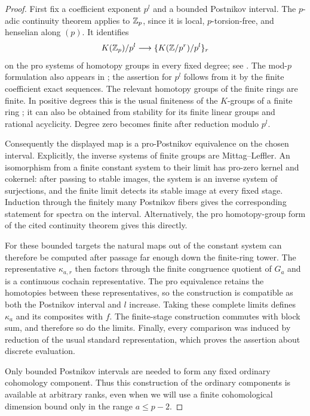\begin{proof}
First fix a coefficient exponent $p^l$ and a bounded Postnikov
interval.  The $p$-adic continuity theorem applies to $\mathbb Z_p$, since it
is local, $p$-torsion-free, and henselian along $(p)$.  It identifies
\[
 K(\mathbb Z_p)/p^l\longrightarrow
 \{K(\mathbb Z/p^r)/p^l\}_r
\]
on the pro systems of homotopy groups in every fixed degree; see
\cite[Theorem~C]{GeisserHesselholt}.  The mod-$p$ formulation also appears in
\cite[Section~5.2, Theorem~5.10]{CMM}; the assertion for $p^l$ follows
from it by the finite coefficient exact sequences.
The relevant homotopy groups of the finite rings are finite.  In
positive degrees this is the usual finiteness of the $K$-groups of a
finite ring \cite[Chapter~IV, Proposition~1.16]{WeibelKBook}; it can also be obtained from stability for its finite
linear groups and rational acyclicity.  Degree zero becomes finite
after reduction modulo $p^l$.

Consequently the displayed map is a pro-Postnikov equivalence on the
chosen interval.  Explicitly, the inverse systems of finite groups
are Mittag--Leffler.  An isomorphism from a finite constant system to
their limit has pro-zero kernel and cokernel: after passing to stable
images, the system is an inverse system of surjections, and the finite
limit detects its stable image at every fixed stage.  Induction through
the finitely many Postnikov fibers gives the corresponding statement
for spectra on the interval.  Alternatively, the pro homotopy-group
form of the cited continuity theorem gives this directly.

For these bounded targets the natural maps out of the constant system
can therefore be computed after passage far enough down the finite-ring
tower.  The representative $\kappa_{a,r}$ then factors through the
finite congruence quotient of $G_a$ and is a continuous cochain
representative.  The pro equivalence retains the homotopies between
these representatives, so the construction is compatible as both the
Postnikov interval and $l$ increase.  Taking these complete limits
defines $\kappa_a$ and its composites with $f$.  The finite-stage
construction commutes with block sum, and therefore so do the limits.
Finally, every comparison was induced by reduction of the usual
standard representation, which proves the assertion about discrete
evaluation.

Only bounded Postnikov intervals are needed to form any fixed ordinary
cohomology component.  Thus this construction of the ordinary
components is available at arbitrary ranks, even when we will use a
finite cohomological dimension bound only in the range $a\leq p-2$.
\end{proof}

